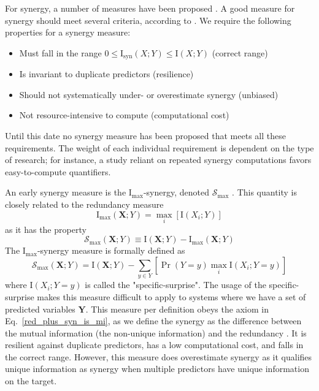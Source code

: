 \documentclass[../main.tex]{subfiles}
\begin{document}
For synergy, a number of measures have been proposed \cite{griffith2014quantifying, olbrich2015information}.
A good measure for synergy should meet several criteria, according to \cite{griffith2014quantifying}.
We require the following properties for a synergy measure:
%
\begin{itemize}
\item Must fall in the range $0 \le \mathrm{I}_\mathrm{syn}\left( X;Y \right) \le \mathrm{I} \left( X;Y \right)$ (correct range)
\item Is invariant to duplicate predictors (resilience)
\item Should not systematically under- or overestimate synergy (unbiased)
\item Not resource-intensive to compute (computational cost)
\end{itemize}
%
Until this date no synergy measure has been proposed that meets all these requirements.
The weight of each individual requirement is dependent on the type of research; for instance, a study reliant on repeated synergy computations favors easy-to-compute quantifiers.

An early synergy measure is the $\mathrm{I}_\mathrm{max}$-synergy, denoted $\mathcal{S}_\mathrm{max}$ \cite{williams2010nonnegative}.
This quantity is closely related to the redundancy measure
%
\begin{equation}
\mathrm{I}_\mathrm{max} \left( \mathbf{X};Y \right) = \max_i [\mathrm{I} \left( X_{i};Y \right)]
\end{equation}
%
as it has the property
%
\begin{equation}
\mathcal{S}_\mathrm{max} \left( \mathbf{X};Y \right) \equiv \mathrm{I} \left( \mathbf{X};Y \right) - \mathrm{I}_\mathrm{max} \left( \mathbf{X};Y \right)
\end{equation}
%
The $\mathrm{I}_\mathrm{max}$-synergy measure is formally defined as
%
\begin{equation}
\mathcal{S}_\mathrm{max} \left( \mathbf{X};Y \right) = \mathrm{I} \left( \mathbf{X};Y \right) - \sum_{y \in Y} [ \Pr \left( Y = y \right) \max_i \mathrm{I} \left( X_i ; Y = y \right) ]
\end{equation}
%
where $\mathrm{I} \left( X_i ; Y = y \right)$ is called the "specific-surprise".
The usage of the specific-surprise makes this measure difficult to apply to systems where we have a set of predicted variables $\mathbf{Y}$.
This measure per definition obeys the axiom in Eq.~\ref{red_plus_syn_is_mi}, as we define the synergy as the difference between the mutual information (the non-unique information) and the redundancy \cite{griffith2014quantifying}.
It is resilient against duplicate predictors, has a low computational cost, and falls in the correct range.
However, this measure does overestimate synergy as it qualifies unique information as synergy when multiple predictors have unique information on the target.
\end{document}

